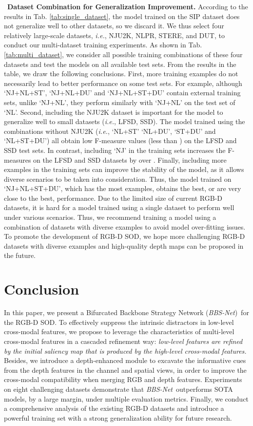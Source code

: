 \documentclass[journal]{IEEEtran}
\newcommand{\tabref}[1]{Tab. \ref{#1}}
\newcommand{\myPara}[1]{\vspace{10pt}\noindent~\textbf{#1} \quad}
\def\ie{\emph{i.e.}}
\def\ourmodel{\emph{BBS-Net}}
\begin{document}
\myPara{\textbf{Dataset Combination for Generalization Improvement.}} 
According to the results in \tabref{tab:single_dataset}, the model trained on the SIP dataset does not generalize well to other datasets, so we discard it. 
We thus select four relatively large-scale datasets, \ie, NJU2K, NLPR, STERE, and DUT, to conduct our multi-dataset training experiments.
As shown in \tabref{tab:multi_dataset}, we consider all possible training combinations of these four datasets and test the models on all available test sets.
From the results in the table, we draw the following conclusions.
First, more training examples do not necessarily lead to better performance on some test sets.
For example, although `NJ+NL+ST', `NJ+NL+DU' and `NJ+NL+ST+DU' contain external training sets, unlike `NJ+NL', they perform similarly with `NJ+NL' on the test set of `NL'.
Second, including the NJU2K dataset is important for the model to generalize well to small datasets (\ie, LFSD, SSD).
The model trained using the combinations without NJU2K (\ie, `NL+ST' `NL+DU', `ST+DU' and `NL+ST+DU') all obtain low F-measure values (less than ) on the LFSD and SSD test sets.
In contrast, including `NJ' in the training sets increases the F-measures on the LFSD and SSD datasets by over .
Finally, including more examples in the training sets can improve the stability of the model, as it allows diverse scenarios to be taken into consideration.
Thus, the model trained on `NJ+NL+ST+DU', which has the most examples, obtains the best, or are very close to the best, performance.
Due to the limited size of current RGB-D datasets, it is hard for a model trained using a single dataset to perform well under various scenarios.
Thus, we recommend training a model using a combination of datasets with diverse examples to avoid model over-fitting issues.
To promote the development of RGB-D SOD, we hope more challenging RGB-D datasets with diverse examples and high-quality depth maps can be proposed in the future.


\section{Conclusion}
In this paper, we present a Bifurcated Backbone Strategy Network (\ourmodel)~for the RGB-D SOD.
To effectively suppress the intrinsic distractors in low-level cross-modal features, we propose to leverage the characteristics of multi-level cross-modal features in a cascaded refinement way: \emph{low-level features are refined by the initial saliency map that is produced by the high-level cross-modal features.}
Besides, we introduce a depth-enhanced module to excavate the informative cues from the depth features in the channel and spatial views, in order to improve the cross-modal compatibility when merging RGB and depth features.
Experiments on eight challenging datasets demonstrate that \ourmodel~outperforms  SOTA models, by a large margin, under multiple evaluation metrics.
Finally, we conduct a comprehensive analysis of the existing RGB-D datasets and introduce a powerful training set with a strong generalization ability for future research. 


\ifCLASSOPTIONcaptionsoff
  \newpage
\fi









\end{document}
